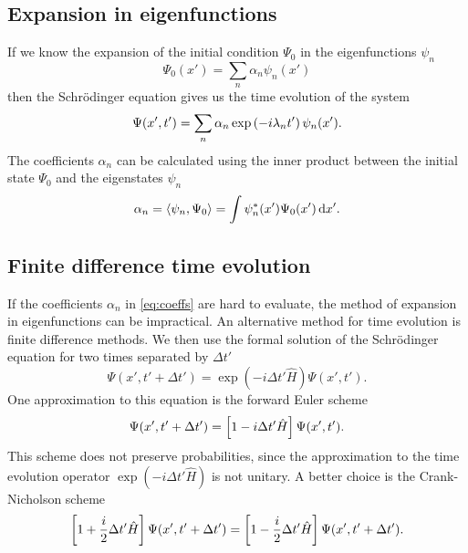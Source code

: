 \subsection*{Expansion in eigenfunctions}
If we know the expansion of the initial condition $\Psi_0$ in the eigenfunctions $\psi_n$
\begin{equation}
    \Psi_0(x') = \sum_n \alpha_n \psi_n(x')
\end{equation}
then the Schrödinger equation gives us the time evolution of the system
\begin{equation}
    \Psi(x', t') = \sum_n \alpha_n \exp\del{-i\lambda_n t'}\psi_n(x').
    \label{eq:time_evolution_expansion}
\end{equation}
The coefficients $\alpha_n$ can be calculated using the inner product between the initial state $\Psi_0$ and the eigenstates $\psi_n$
\begin{equation}
    \alpha_n = \langle \psi_n, \Psi_0 \rangle = \int \psi_n^{*}(x')\Psi_0(x') \mathop{}\!\mathrm{d} x'.
    \label{eq:coeffs}
\end{equation}

\subsection*{Finite difference time evolution}
If the coefficients $\alpha_n$ in \cref{eq:coeffs} are hard to evaluate, the method of expansion in eigenfunctions can be impractical. An alternative method for time evolution is finite difference methods. We then use the formal solution of the Schrödinger equation for two times separated by $\Delta t'$
\begin{equation}
    \Psi(x', t' + \Delta t') = \exp(-i\Delta t' \hat H)\Psi(x', t').
\end{equation}
One approximation to this equation is the forward Euler scheme
\begin{equation}
    \Psi(x', t'+\Delta t') = \sbr{1 - i\Delta t' \hat H} \Psi(x', t').
\end{equation}
This scheme does not preserve probabilities, since the approximation to the time evolution operator $\exp(-i\Delta t' \hat H)$ is not unitary. A better choice is the Crank-Nicholson scheme
\begin{equation}
    \sbr{1 + \frac{i}{2}\Delta t' \hat H} \Psi(x', t'+\Delta t') = \sbr{1 - \frac{i}{2}\Delta t' \hat H} \Psi(x', t'+\Delta t').
\end{equation}


